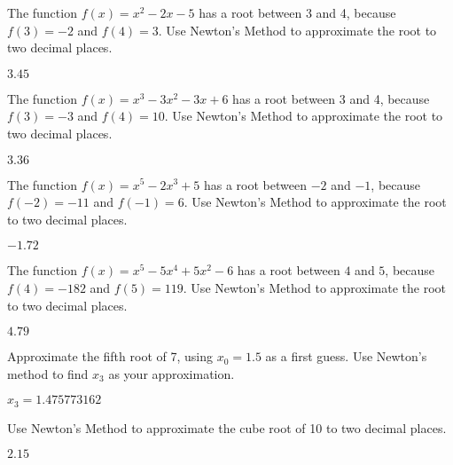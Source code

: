 \begin{exercises}

\begin{exercise} The function 
$f(x)=x^2-2x-5$ has a root between 3 and 4, because $f(3)=-2$ and
  $f(4)=3$. Use Newton's Method to approximate the root to two decimal
  places.
\begin{answer}  $3.45$
\end{answer}\end{exercise}

\begin{exercise} The function 
$f(x)=x^3-3x^2-3x+6$ has a root between 3 and 4, because $f(3)=-3$ and
  $f(4)=10$. Use Newton's Method to approximate the root to two
  decimal places.
\begin{answer}  $3.36$
\end{answer}\end{exercise}

\begin{exercise} The function 
$f(x)=x^5-2x^3+5$ has a root between $-2$ and $-1$, because
  $f(-2)=-11$ and $f(-1)=6$. Use Newton's Method to approximate the
  root to two decimal places.
\begin{answer}  $-1.72$
\end{answer}\end{exercise}


\begin{exercise} The function 
$f(x)=x^5-5x^4+5x^2-6$ has a root between $4$ and $5$, because
  $f(4)=-182$ and $f(5)=119$. Use Newton's Method to approximate the
  root to two decimal places.
\begin{answer}  $4.79$
\end{answer}\end{exercise}

\begin{exercise} Approximate the fifth root of 7, using $x_0=1.5$ as a
first guess. Use Newton's method to find $x_3$ as your
approximation.  
\begin{answer} $x_3=1.475773162$ 
\end{answer}\end{exercise}

\begin{exercise} Use Newton's Method to approximate the cube root of 10 to
two decimal places.
\begin{answer} $2.15$
\end{answer}\end{exercise}



\end{exercises}

